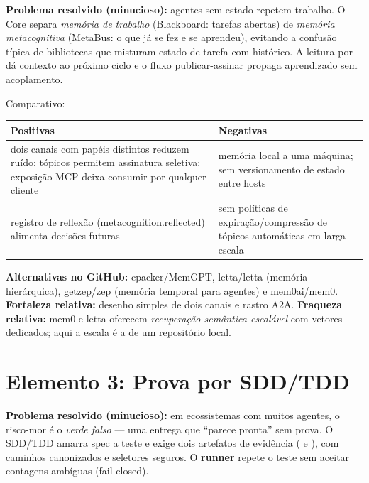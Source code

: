 
\begin{funcao}
\textbf{Problema resolvido (minucioso):} agentes sem estado repetem trabalho. O
Core separa \emph{memória de trabalho} (Blackboard: tarefas abertas) de
\emph{memória metacognitiva} (MetaBus: o que já se fez e se aprendeu), evitando a
confusão típica de bibliotecas que misturam estado de tarefa com histórico.
A leitura por  dá contexto ao próximo ciclo e o
fluxo publicar-assinar propaga aprendizado sem acoplamento.
\end{funcao}

\begin{resultado}
Comparativo:\par
\smallskip
{\footnotesize
\begin{tabularx}{\linewidth}{YY}
\toprule
Positivas & Negativas \\
\midrule
dois canais com papéis distintos reduzem ruído; tópicos permitem assinatura
seletiva; exposição MCP deixa consumir por qualquer cliente & memória local a uma
máquina; sem versionamento de estado entre hosts \\
registro de reflexão (metacognition.reflected) alimenta decisões futuras &
sem políticas de expiração/compressão de tópicos automáticas em larga escala \\
\bottomrule
\end{tabularx}\par}
\end{resultado}

\begin{metodo}
\textbf{Alternativas no GitHub:} cpacker/MemGPT, letta/letta (memória
hierárquica), getzep/zep (memória temporal para agentes) e mem0ai/mem0.
\textbf{Fortaleza relativa:} desenho simples de dois canais e rastro A2A.
\textbf{Fraqueza relativa:} mem0 e letta oferecem \emph{recuperação semântica
escalável} com vetores dedicados; aqui a escala é a de um repositório local.
\end{metodo}

\clearpage
\section{Elemento 3: Prova por SDD/TDD}


\begin{funcao}
\textbf{Problema resolvido (minucioso):} em ecossistemas com muitos agentes, o
risco-mor é o \emph{verde falso} — uma entrega que ``parece pronta'' sem prova.
O SDD/TDD amarra spec a teste e exige dois artefatos de evidência
( e ), com caminhos
canonizados e seletores seguros. O \textbf{runner} repete o teste sem aceitar
contagens ambíguas (fail-closed).
\end{funcao}

